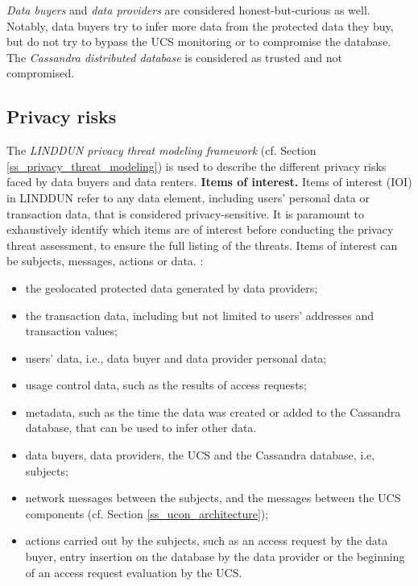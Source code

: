\emph{Data buyers} and \emph{data providers} are considered honest-but-curious as well. Notably, data buyers try to infer more data from the protected data they buy, but do not try to bypass the UCS monitoring or to compromise the database.
The \emph{Cassandra distributed database} is considered as trusted and not compromised.

\subsection{Privacy risks}
\label{ss_privacy_risks}

 The \emph{LINDDUN privacy threat modeling framework} \cite{Deng2011} (cf. Section \ref{ss_privacy_threat_modeling}) is used to describe the 
 different privacy risks faced by data buyers and data renters.
\textbf{Items of interest.} Items of interest (IOI) in LINDDUN refer to any data element, including users' personal data or transaction data, that is considered privacy-sensitive. It is paramount to exhaustively identify which items are of interest before conducting the privacy threat assessment, to ensure the full listing of the threats. Items of interest can be subjects, messages, actions or data. :
\begin{itemize}
    \item the geolocated protected data generated by data providers;
    \item the transaction data, including but not limited to users' addresses and transaction values;
    \item users' data, i.e., data buyer and data provider personal data;
    \item usage control data, such as the results of access requests;
    \item metadata, such as the time the data was created or added to the Cassandra database, that can be used to infer other data.
    \item data buyers, data providers, the UCS and the Cassandra database, i.e, subjects;
    \item network messages between the subjects, and the messages between the UCS components (cf. Section \ref{ss_ucon_architecture});
    \item actions carried out by the subjects, such as an access request by the data buyer, entry insertion on the database by the data provider or the beginning of an access request evaluation by the UCS.
\end{itemize}

